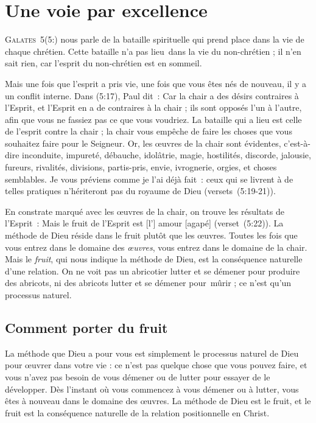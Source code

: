 \chapter{Une voie par excellence}

\lettrine{G}{alates~5}(5:) nous parle de
 la bataille spirituelle
 qui prend place dans la vie de chaque chrétien.
 Cette bataille n'a pas lieu~dans la vie du non-chrétien ;
 il n'en sait rien, car l'esprit du non-chrétien est en sommeil.

Mais une fois que l'esprit a pris vie, une fois que vous êtes nés de nouveau,
 il y a un conflit interne. Dans (5:17), Paul dit~:
 \Og Car la chair a des désirs contraires à l'Esprit,
 et l'Esprit en a de contraires à la chair ; ils sont opposés l'un à l'autre,
 afin que vous ne fassiez pas ce que vous voudriez. \Fg{}
 La bataille qui a lieu est celle de l'esprit contre la chair ;
 la chair vous empêche de faire les choses que vous souhaitez
 faire pour le Seigneur.
 \Og Or, les œuvres de la chair sont évidentes, c'est-à-dire inconduite,
 impureté, débauche, idolâtrie, magie, hostilités, discorde, jalousie,
 fureurs, rivalités, divisions, partis-pris, envie, ivrognerie, orgies,
 et choses semblables. Je vous préviens comme je l'ai déjà fait~:
 ceux qui se livrent à de telles pratiques n'hériteront pas
 du royaume de Dieu \Fg{} (versets~(5:19-21)).

En constrate marqué avec les œuvres de la chair, on trouve les résultats
 de l'Esprit~: \Og Mais le fruit de l'Esprit est [l'] amour [agapé] \Fg{}
 (verset~(5:22)). La méthode de Dieu réside dans le fruit
 plutôt que les œuvres. Toutes les fois que vous entrez dans le domaine
 des \emph{œuvres}, vous entrez dans le domaine de la chair.
 Mais le \emph{fruit}, qui nous indique la méthode de Dieu, est la conséquence
 naturelle d'une relation. On ne voit pas un abricotier lutter
 et se démener pour produire des abricots, ni des abricots lutter
 et se démener pour~mûrir ; ce n'est qu'un processus naturel.


\section{Comment porter du fruit}

La méthode que Dieu a pour vous est simplement le processus naturel
 de Dieu pour œuvrer dans votre vie : ce n'est pas quelque chose
 que vous pouvez faire, et vous n'avez pas besoin de vous démener
 ou de lutter pour essayer de le développer.
 Dès l'instant où vous commencez à vous démener ou à lutter,
 vous êtes à nouveau dans le domaine des œuvres.
 La méthode de Dieu est le fruit, et le fruit est la conséquence
 naturelle de la relation positionnelle en Christ.

